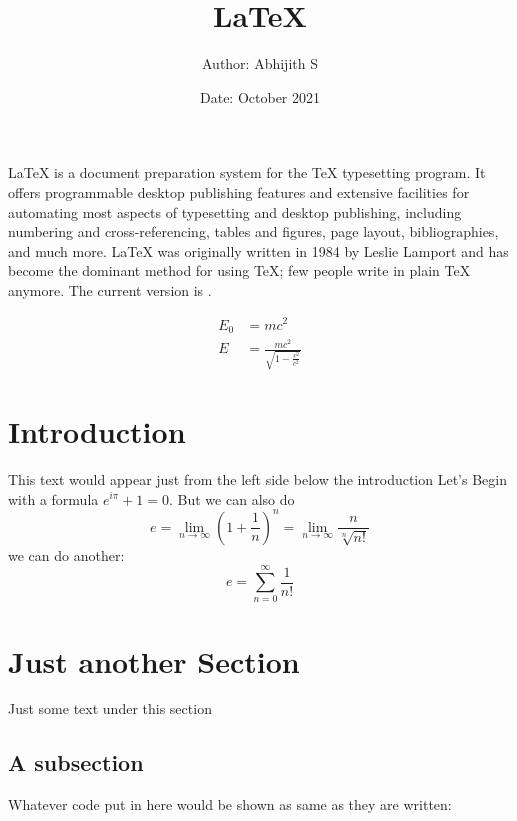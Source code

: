 \documentclass{article}     %
\title{\LaTeX{}}             %
\author{Author: Abhijith S} %
\date{Date: October 2021}   %
\begin{document}

\centering
\tableofcontents %
\listoffigures
\maketitle
  \LaTeX{} is a document preparation system for
  the \TeX{} typesetting program. It offers
  programmable desktop publishing features and
  extensive facilities for automating most
  aspects of typesetting and desktop publishing,
  including numbering and  cross-referencing,
  tables and figures, page layout,
  bibliographies, and much more. \LaTeX{} was
  originally written in 1984 by Leslie Lamport
  and has become the  dominant method for using
  \TeX; few people write in plain \TeX{} anymore.
  The current version is \LaTeXe.

  \begin{align}
    E_0 &= mc^2 \\
    E &= \frac{mc^2}{\sqrt{1-\frac{v^2}{c^2}}}
  \end{align} 



\section{Introduction}

This text would appear just from the left side below the introduction
\newline
Let's Begin with a formula  $e^{i\pi}+1 = 0$. 
\newline
But we can also do 
$$e =  \lim_{n\to\infty}\left(1+ \frac{1}{n}\right)^n = \lim_{n\to\infty}\frac{n}{\sqrt[n]{n!}}$$
we can do another: $$e = \sum_{n=0}^{\infty}\frac{1}{n!}$$

\section{Just another Section}
     Just some text under this section 
     \subsection{A subsection}
Whatever code put in here would be shown as same as they are written:
\end{document}

